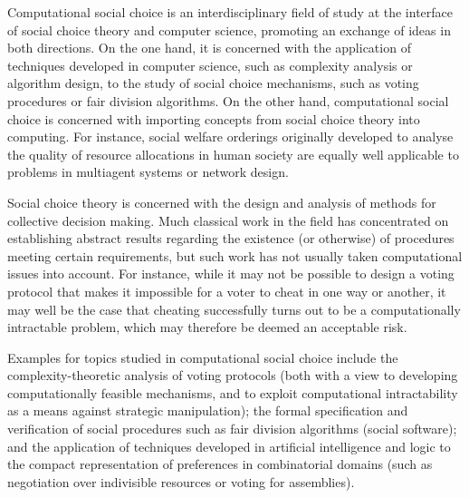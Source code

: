 \documentclass{comsoc}
\begin{document}
Computational social choice is an interdisciplinary field of study at the
interface of social choice theory and computer science, promoting an 
exchange of ideas in both directions. On the one hand, it is concerned 
with the application of techniques developed in computer science, such as
complexity analysis or algorithm design, to the study of social choice 
mechanisms, such as voting procedures or fair division algorithms. On the
other hand, computational social choice is concerned with importing 
concepts from social choice theory into computing. For instance, social 
welfare orderings originally developed to analyse the quality of resource
allocations in human society are equally well applicable to problems in 
multiagent systems or network design.

Social choice theory is concerned with the design and analysis of methods
for collective decision making. Much classical work in the field has 
concentrated on establishing abstract results regarding the existence 
(or otherwise) of procedures meeting certain requirements, but such work 
has not usually taken computational issues into account. For instance, 
while it may not be possible to design a voting protocol that makes it 
impossible for a voter to cheat in one way or another, it may well be 
the case that cheating successfully turns out to be a computationally 
intractable problem, which may therefore be deemed an acceptable risk.

Examples for topics studied in computational social choice include the 
complexity-theoretic analysis of voting protocols (both with a view to 
developing computationally feasible mechanisms, and to exploit 
computational intractability as a means against strategic manipulation); 
the formal specification and verification of social procedures such as 
fair division algorithms (social software); and the application of 
techniques developed in artificial intelligence and logic to the compact 
representation of preferences in combinatorial domains (such as 
negotiation over indivisible resources or voting for assemblies).


\end{document}
